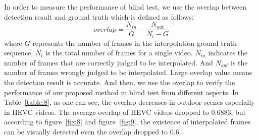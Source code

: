 \documentclass[pdftex,twocolumn,epjc3]{svjour3}          %
\begin{document}
In order to measure the performance of blind test, we use the overlap between detection result and ground truth which is defined as follows:
\begin{equation}
overlap=\frac{N_{in}}{G}-\frac{N_{out}}{N_t-G}
\label{formula:14}
\end{equation}
where $G$ represents the number of frames in the interpolation ground truth sequence, $N_t$ is the total number of frames for a single video. $N_{in}$ indicates the number of frames that are correctly judged to be interpolated. And $N_{out}$ is the number of frames wrongly judged to be interpolated. Large overlap value means the detection result is accurate. And then, we use the overlap to verify the performance of our proposed method in blind test from different aspects. In Table~\ref{table:8}, as one can see, the overlap decreases in outdoor scenes especially in HEVC videos. The average overlap of HEVC videos dropped to 0.6883, but according to figure~\ref{fig:8} and figure~\ref{fig:9}, the existence of interpolated frames can be visually detected even the overlap dropped to 0.6.
\end{document}
